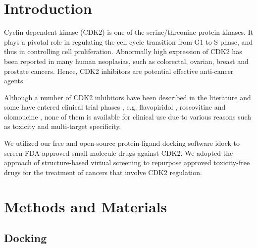 \documentclass[10pt]{article}
\begin{document}

\section*{Introduction}
Cyclin-dependent kinase (CDK2) is one of the serine/threonine protein kinases. It plays a pivotal role in regulating the cell cycle transition from G1 to S phase, and thus in controlling cell proliferation. Abnormally high expression of CDK2 has been reported in many human neoplasias, such as colorectal, ovarian, breast and prostate cancers. Hence, CDK2 inhibitors are potential effective anti-cancer agents.

Although a number of CDK2 inhibitors have been described in the literature and some have entered clinical trial phases \citep{1603}, e.g. flavopiridol \citep{1596}, roscovitine \citep{1597} and olomoucine \citep{1598}, none of them is available for clinical use due to various reasons such as toxicity and multi-target specificity.

We utilized our free and open-source protein-ligand docking software idock \citep{1153,1362} to screen FDA-approved small molecule drugs against CDK2. We adopted the approach of structure-based virtual screening to repurpose approved toxicity-free drugs for the treatment of cancers that involve CDK2 regulation.

\section*{Methods and Materials}

\subsection*{Docking}
\end{document}
